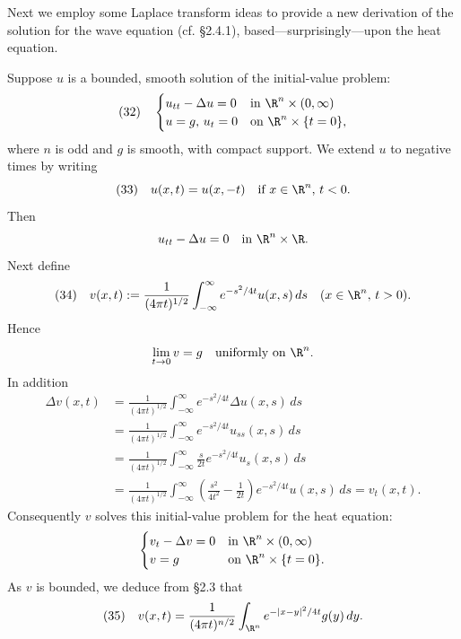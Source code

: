 \begin{example}
\label{ex:wave-equation-from-heat-laplace-transform}
Next we employ some Laplace transform ideas to provide a new derivation of the solution for the wave equation (cf. \S2.4.1), based---surprisingly---upon the heat equation.

Suppose $u$ is a bounded, smooth solution of the initial-value problem:
$$
(32) \quad \begin{cases} u_{tt} - \Delta u = 0 & \text{in } \R^n \times (0, \infty) \\ u = g, \, u_t = 0 & \text{on } \R^n \times \{t = 0\}, \end{cases}
$$
where $n$ is odd and $g$ is smooth, with compact support. We extend $u$ to negative times by writing
$$(33) \quad u(x,t) = u(x, -t) \quad \text{if } x \in \R^n, \, t < 0.$$
Then
$$u_{tt} - \Delta u = 0 \quad \text{in } \R^n \times \R.$$
Next define
$$(34) \quad v(x,t) := \frac{1}{(4\pi t)^{1/2}} \int_{-\infty}^{\infty} e^{-s^2/4t} u(x,s) \, ds \quad (x \in \R^n, \, t > 0).$$
Hence
$$\lim_{t \to 0} v = g \quad \text{uniformly on } \R^n.$$
In addition
\begin{align*}
\Delta v(x,t) &= \frac{1}{(4\pi t)^{1/2}} \int_{-\infty}^{\infty} e^{-s^2/4t} \Delta u(x,s) \, ds \\
&= \frac{1}{(4\pi t)^{1/2}} \int_{-\infty}^{\infty} e^{-s^2/4t} u_{ss}(x,s) \, ds \\
&= \frac{1}{(4\pi t)^{1/2}} \int_{-\infty}^{\infty} \frac{s}{2t} e^{-s^2/4t} u_s(x,s) \, ds \\
&= \frac{1}{(4\pi t)^{1/2}} \int_{-\infty}^{\infty} \left(\frac{s^2}{4t^2} - \frac{1}{2t}\right) e^{-s^2/4t} u(x,s) \, ds = v_t(x,t).
\end{align*}
Consequently $v$ solves this initial-value problem for the heat equation:
$$\begin{cases} v_t - \Delta v = 0 & \text{in } \R^n \times (0, \infty) \\ v = g & \text{on } \R^n \times \{t = 0\}. \end{cases}$$
As $v$ is bounded, we deduce from \S2.3 that
$$(35) \quad v(x,t) = \frac{1}{(4\pi t)^{n/2}} \int_{\R^n} e^{-|x-y|^2/4t} g(y) \, dy.$$


\end{example}
